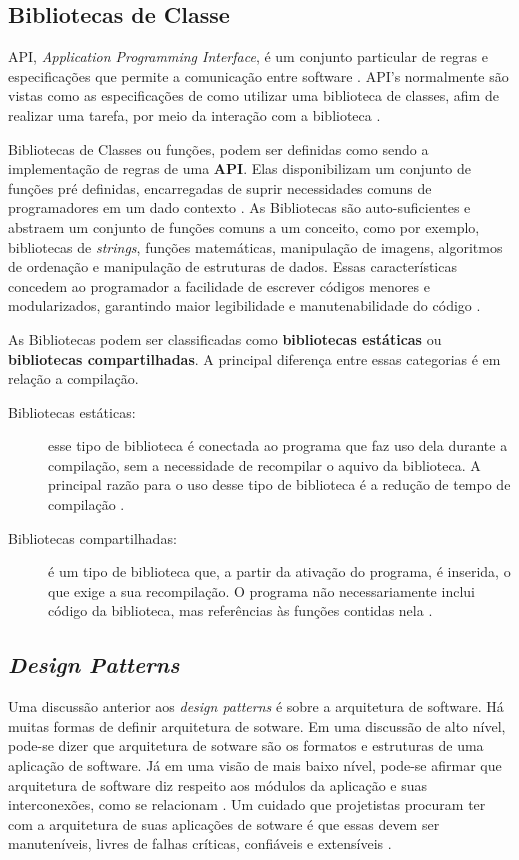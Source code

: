 \subsection{Bibliotecas de Classe}
API, \textit{Application Programming Interface}, é um conjunto particular de regras e especificações que permite a comunicação entre  software \cite{simsek2004}. API's normalmente são vistas como as especificações de como utilizar uma biblioteca de classes, afim de realizar uma tarefa, por meio da interação com a biblioteca \cite{simsek2004}.
\par
\indent Bibliotecas de Classes ou funções, podem ser definidas como sendo a implementação de regras de uma \textbf{API}. Elas disponibilizam um conjunto de funções pré definidas, encarregadas de suprir necessidades comuns de programadores em um dado contexto \cite{simsek2004}. As Bibliotecas são auto-suficientes e abstraem um conjunto de funções comuns a um conceito, como por exemplo, bibliotecas de \textit{strings}, funções matemáticas, manipulação de imagens, algoritmos de ordenação e manipulação de estruturas de dados. Essas características concedem ao programador a facilidade de escrever códigos menores e modularizados, garantindo maior legibilidade e manutenabilidade do código \cite{simsek2004}.
\par
\indent As Bibliotecas podem ser classificadas como \textbf{bibliotecas estáticas} ou \textbf{bibliotecas compartilhadas}. A principal diferença entre essas categorias é em relação a compilação.
\begin{description}
\item[Bibliotecas estáticas:] esse tipo de biblioteca é conectada ao programa que faz uso dela durante a compilação, sem a necessidade de recompilar o aquivo da biblioteca. A principal razão para o uso desse tipo de biblioteca é a redução de tempo de compilação \cite{simsek2004}.
\item[Bibliotecas compartilhadas:] é um tipo de biblioteca que, a partir da ativação do programa, é inserida, o que exige a sua recompilação. O programa não necessariamente inclui código da biblioteca, mas referências às funções contidas nela \cite{simsek2004}.
\end{description}

\subsection{\textit{Design Patterns}}
Uma discussão anterior aos \textit{design patterns} é sobre a arquitetura de software. Há muitas formas de definir arquitetura de sotware. Em uma discussão de alto nível, pode-se dizer que arquitetura de sotware são os formatos e estruturas de uma aplicação de software. Já em uma visão de mais baixo nível, pode-se afirmar que arquitetura de software diz respeito aos módulos da aplicação e suas interconexões, como se relacionam \cite{martin2000}. Um cuidado que projetistas procuram ter com a arquitetura de suas aplicações de sotware é que essas devem ser manuteníveis, livres de falhas críticas, confiáveis e extensíveis \cite{kleinWeiss2009}.


